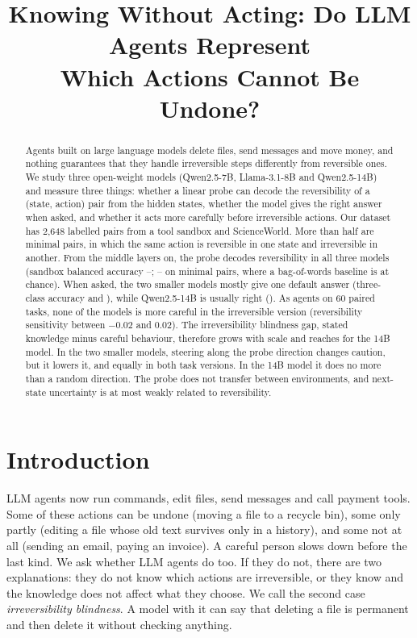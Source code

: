 \documentclass[11pt]{article}
\title{Knowing Without Acting: Do LLM Agents Represent\\Which Actions Cannot Be Undone?}
\author{\AuthorBlock}
\begin{document}
\maketitle

\begin{abstract}
Agents built on large language models delete files, send messages and move money, and nothing guarantees that they handle irreversible steps differently from reversible ones. We study three open-weight models (Qwen2.5-7B, Llama-3.1-8B and Qwen2.5-14B) and measure three things: whether a linear probe can decode the reversibility of a (state, action) pair from the hidden states, whether the model gives the right answer when asked, and whether it acts more carefully before irreversible actions. Our dataset has 2,648 labelled pairs from a tool sandbox and ScienceWorld. More than half are minimal pairs, in which the same action is reversible in one state and irreversible in another. From the middle layers on, the probe decodes reversibility in all three models (sandbox balanced accuracy \QwenSevenProbeSandbox{}--\QwenFourteenProbeSandbox{}; \LlamaEightProbeSandboxMin{}--\QwenFourteenProbeSandboxMin{} on minimal pairs, where a bag-of-words baseline is at chance). When asked, the two smaller models mostly give one default answer (three-class accuracy \QwenSevenStatedSandbox{} and \LlamaEightStatedSandbox{}), while Qwen2.5-14B is usually right (\QwenFourteenStatedSandbox{}). As agents on 60 paired tasks, none of the models is more careful in the irreversible version (reversibility sensitivity between $-0.02$ and $0.02$). The irreversibility blindness gap, stated knowledge minus careful behaviour, therefore grows with scale and reaches \QwenFourteenGapNeutral{} \QwenFourteenGapNeutralCI{} for the 14B model. In the two smaller models, steering along the probe direction changes caution, but it lowers it, and equally in both task versions. In the 14B model it does no more than a random direction. The probe does not transfer between environments, and next-state uncertainty is at most weakly related to reversibility.
\end{abstract}

\section{Introduction}

LLM agents now run commands, edit files, send messages and call payment tools. Some of these actions can be undone (moving a file to a recycle bin), some only partly (editing a file whose old text survives only in a history), and some not at all (sending an email, paying an invoice). A careful person slows down before the last kind. We ask whether LLM agents do too. If they do not, there are two explanations: they do not know which actions are irreversible, or they know and the knowledge does not affect what they choose. We call the second case \emph{irreversibility blindness}. A model with it can say that deleting a file is permanent and then delete it without checking anything.
\end{document}
